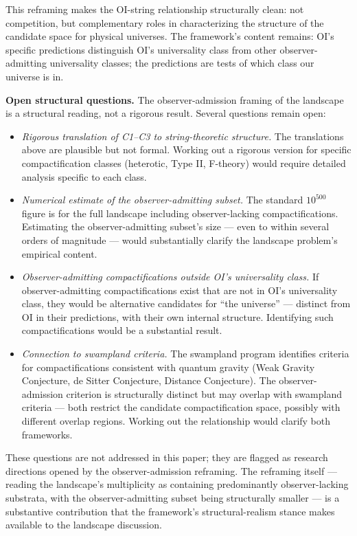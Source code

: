 \documentclass[
]{article}
\begin{document}
This reframing makes the OI-string relationship structurally clean: not
competition, but complementary roles in characterizing the structure of
the candidate space for physical universes. The framework's content
remains: OI's specific predictions distinguish OI's universality class
from other observer-admitting universality classes; the predictions are
tests of which class our universe is in.

\textbf{Open structural questions.} The observer-admission framing of
the landscape is a structural reading, not a rigorous result. Several
questions remain open:

\begin{itemize}
\item
  \emph{Rigorous translation of C1--C3 to string-theoretic structure.}
  The translations above are plausible but not formal. Working out a
  rigorous version for specific compactification classes (heterotic,
  Type II, F-theory) would require detailed analysis specific to each
  class.
\item
  \emph{Numerical estimate of the observer-admitting subset.} The
  standard \(10^{500}\) figure is for the full landscape including
  observer-lacking compactifications. Estimating the observer-admitting
  subset's size --- even to within several orders of magnitude --- would
  substantially clarify the landscape problem's empirical content.
\item
  \emph{Observer-admitting compactifications outside OI's universality
  class.} If observer-admitting compactifications exist that are not in
  OI's universality class, they would be alternative candidates for
  ``the universe'' --- distinct from OI in their predictions, with their
  own internal structure. Identifying such compactifications would be a
  substantial result.
\item
  \emph{Connection to swampland criteria.} The swampland program
  identifies criteria for compactifications consistent with quantum
  gravity (Weak Gravity Conjecture, de Sitter Conjecture, Distance
  Conjecture). The observer-admission criterion is structurally distinct
  but may overlap with swampland criteria --- both restrict the
  candidate compactification space, possibly with different overlap
  regions. Working out the relationship would clarify both frameworks.
\end{itemize}

These questions are not addressed in this paper; they are flagged as
research directions opened by the observer-admission reframing. The
reframing itself --- reading the landscape's multiplicity as containing
predominantly observer-lacking substrata, with the observer-admitting
subset being structurally smaller --- is a substantive contribution that
the framework's structural-realism stance makes available to the
landscape discussion.
\end{document}
